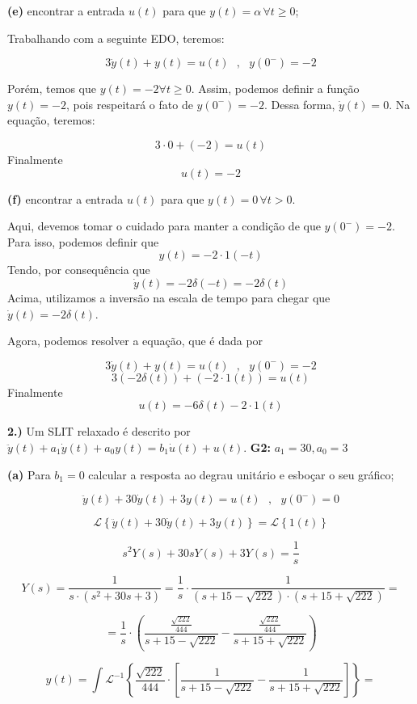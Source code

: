 \documentclass{article}
\begin{document}
\textbf{(e)} encontrar a entrada $u(t)$ para que $y(t) = \alpha\,\forall t \geq 0$;

Trabalhando com a seguinte EDO, teremos:

\[3\dot{y}(t) + y(t) = u(t)\,\,\,\,,\,\,\,\,y(0^-) = -2\]

Porém, temos que $y(t) = -2 \forall t \geq 0$. Assim, podemos definir a função $y(t) = -2$, pois respeitará o fato de $y(0^-) = -2$. Dessa forma, $\dot{y}(t) = 0$. Na equação, teremos:

\[3\cdot 0 + (-2) = u(t)\]
Finalmente
\[u(t) = -2\]

\textbf{(f)} encontrar a entrada $u(t)$ para que  $y(t) = 0\,\forall t > 0$.

Aqui, devemos tomar o cuidado para manter a condição de que $y(0^-) = -2$. Para isso, podemos definir que
\[y(t) = -2 \cdot 1(-t)\]
Tendo, por consequência que
\[\dot{y}(t) = -2\delta(-t) = -2\delta(t)\]
Acima, utilizamos a inversão na escala de tempo para chegar que $\dot{y}(t) = -2\delta(t)$.

Agora, podemos resolver a equação, que é dada por

\[3\dot{y}(t) + y(t) = u(t)\,\,\,\,,\,\,\,\,y(0^-) = -2\]
\[3(-2\delta(t)) + (-2\cdot 1(t)) = u(t)\]
Finalmente
\[u(t) = -6\delta(t) - 2\cdot 1(t)\]

\vspace{\baselineskip}

\textbf{2.)} Um SLIT relaxado é descrito por $\ddot{y}(t) + a_1\dot{y}(t) + a_0y(t) = b_1\dot{u}(t) + u(t)$.
\textbf{G2:} $a_1 = 30, a_0 = 3$

\textbf{(a)} Para $b_1 = 0$ calcular a resposta ao degrau unitário e esboçar o seu gráfico;

\[\ddot{y}(t) + 30\dot{y}(t) + 3y(t) = u(t)\,\,\,\,,\,\,\,\,y(0^{-}) = 0\]

\[\mathcal{L} \left\{\ddot{y}(t) + 30\dot{y}(t) + 3y(t)\right\} = \mathcal{L} \left\{1(t)\right\}\]

\[ s^{2}Y(s) + 30sY(s) + 3Y(s) = \frac{1}{s} \]

\[ Y(s) = \frac{1}{s \cdot (s^{2} + 30s + 3)} = \frac{1}{s} \cdot \frac{1}{(s + 15 - \sqrt{222}) \cdot (s + 15 + \sqrt{222})} =\]

\[ = \frac{1}{s} \cdot \left(\frac{ \frac{\sqrt{222}}{444}}{s + 15 - \sqrt{222}} - \frac{\frac{\sqrt{222}}{444}}{s + 15 + \sqrt{222}}\right) \]

\[ y(t) = \int \mathcal{L}^{-1} \left\{\frac{\sqrt{222}}{444} \cdot \left[ \frac{1}{s + 15 - \sqrt{222}} - \frac{1}{s + 15 + \sqrt{222}} \right] \right\} = \]
\end{document}
